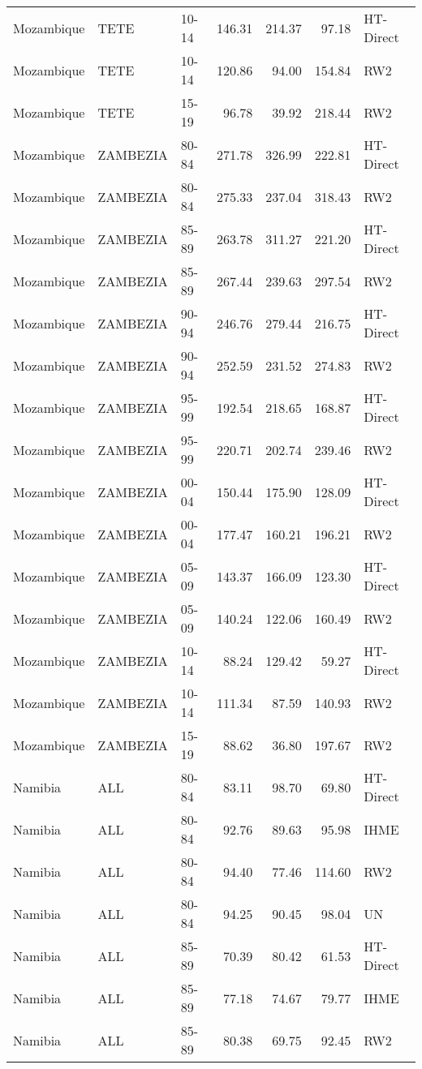 \begin{longtable}{lllrrrl}
  Mozambique & TETE & 10-14 & 146.31 & 214.37 & 97.18 & HT-Direct \\ 
  Mozambique & TETE & 10-14 & 120.86 & 94.00 & 154.84 & RW2 \\ 
  Mozambique & TETE & 15-19 & 96.78 & 39.92 & 218.44 & RW2 \\ 
  Mozambique & ZAMBEZIA & 80-84 & 271.78 & 326.99 & 222.81 & HT-Direct \\ 
  Mozambique & ZAMBEZIA & 80-84 & 275.33 & 237.04 & 318.43 & RW2 \\ 
  Mozambique & ZAMBEZIA & 85-89 & 263.78 & 311.27 & 221.20 & HT-Direct \\ 
  Mozambique & ZAMBEZIA & 85-89 & 267.44 & 239.63 & 297.54 & RW2 \\ 
  Mozambique & ZAMBEZIA & 90-94 & 246.76 & 279.44 & 216.75 & HT-Direct \\ 
  Mozambique & ZAMBEZIA & 90-94 & 252.59 & 231.52 & 274.83 & RW2 \\ 
  Mozambique & ZAMBEZIA & 95-99 & 192.54 & 218.65 & 168.87 & HT-Direct \\ 
  Mozambique & ZAMBEZIA & 95-99 & 220.71 & 202.74 & 239.46 & RW2 \\ 
  Mozambique & ZAMBEZIA & 00-04 & 150.44 & 175.90 & 128.09 & HT-Direct \\ 
  Mozambique & ZAMBEZIA & 00-04 & 177.47 & 160.21 & 196.21 & RW2 \\ 
  Mozambique & ZAMBEZIA & 05-09 & 143.37 & 166.09 & 123.30 & HT-Direct \\ 
  Mozambique & ZAMBEZIA & 05-09 & 140.24 & 122.06 & 160.49 & RW2 \\ 
  Mozambique & ZAMBEZIA & 10-14 & 88.24 & 129.42 & 59.27 & HT-Direct \\ 
  Mozambique & ZAMBEZIA & 10-14 & 111.34 & 87.59 & 140.93 & RW2 \\ 
  Mozambique & ZAMBEZIA & 15-19 & 88.62 & 36.80 & 197.67 & RW2 \\ 
  Namibia & ALL & 80-84 & 83.11 & 98.70 & 69.80 & HT-Direct \\ 
  Namibia & ALL & 80-84 & 92.76 & 89.63 & 95.98 & IHME \\ 
  Namibia & ALL & 80-84 & 94.40 & 77.46 & 114.60 & RW2 \\ 
  Namibia & ALL & 80-84 & 94.25 & 90.45 & 98.04 & UN \\ 
  Namibia & ALL & 85-89 & 70.39 & 80.42 & 61.53 & HT-Direct \\ 
  Namibia & ALL & 85-89 & 77.18 & 74.67 & 79.77 & IHME \\ 
  Namibia & ALL & 85-89 & 80.38 & 69.75 & 92.45 & RW2 \\ 

\end{longtable}
